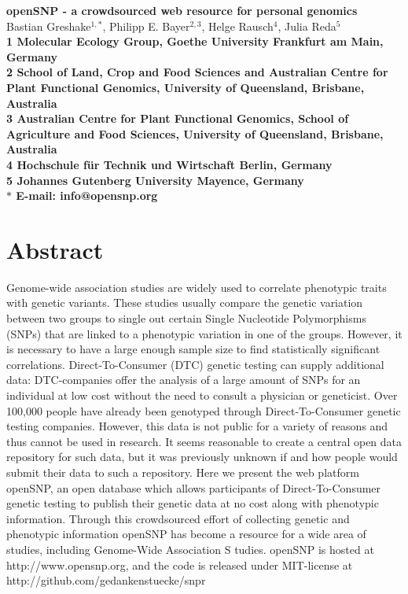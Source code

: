 \documentclass[10pt]{article}
\date{}
\begin{document}
\begin{flushleft}
{\Large
\textbf{openSNP - a crowdsourced web resource for personal genomics}
}
% 
\\
Bastian Greshake$^{1,\ast}$, 
Philipp E. Bayer$^{2,3}$, 
Helge Rausch$^{4}$,
Julia Reda$^{5}$
\\
\bf{1} Molecular Ecology Group, Goethe University Frankfurt am Main, Germany
\\
\bf{2} School of Land, Crop and Food Sciences and Australian Centre for Plant Functional Genomics, University of Queensland, Brisbane, Australia
\\
\bf{3} Australian Centre for Plant Functional Genomics, School of Agriculture and Food Sciences, University of Queensland, Brisbane, Australia
\\
\bf{4} Hochschule f\"ur Technik und Wirtschaft Berlin, Germany 
\\
\bf{5} Johannes Gutenberg University Mayence, Germany
\\
$\ast$ E-mail: info@opensnp.org
\end{flushleft}

\section*{Abstract}
Genome-wide association studies are widely used to correlate phenotypic traits with genetic variants. These studies usually compare the genetic variation between two groups to single out certain Single Nucleotide Polymorphisms (SNPs) that are linked to a phenotypic variation in one of the groups. However, it is necessary to have a large enough sample size to find statistically significant correlations. Direct-To-Consumer (DTC) genetic testing can supply additional data: DTC-companies offer the analysis of a large amount of SNPs for an individual at low cost without the need to consult a physician or geneticist. Over 100,000 people have already been genotyped through Direct-To-Consumer genetic testing companies. However, this data is not public for a variety of reasons and thus cannot be used in research. It seems reasonable to create a central open data repository for such data, but it was previously unknown if and how people would submit their data to such a repository. Here 
we present the web platform openSNP, an open database which allows participants of Direct-To-Consumer genetic testing to publish their genetic data at no cost along with phenotypic information. Through this crowdsourced effort of collecting genetic and phenotypic information openSNP has become a 
resource for a wide area of studies, including Genome-Wide Association S
tudies. openSNP is hosted at http://www.opensnp.org, and the code is released under MIT-license at http://github.com/gedankenstuecke/snpr
\end{document}
